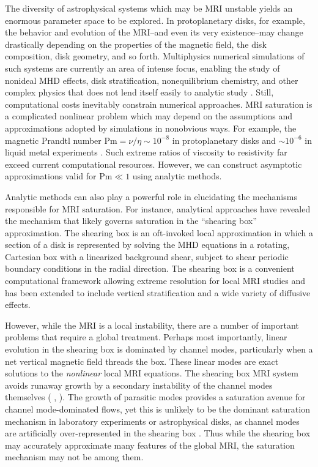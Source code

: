 \documentclass{emulateapj}
\newcommand{\citei}[1]{\citeauthor{#1} \citeyear{#1}}
\newcommand{\Pm}{\mathrm{Pm}}
\begin{document}
The diversity of astrophysical systems which may be MRI unstable yields an enormous parameter space to be explored. In protoplanetary disks, for example, the behavior and evolution of the MRI--and even its very existence--may change drastically depending on the properties of the magnetic field, the disk composition, disk geometry, and so forth. Multiphysics numerical simulations of such systems are currently an area of intense focus, enabling the study of nonideal MHD effects, disk stratification, nonequilibrium chemistry, and other complex physics that does not lend itself easily to analytic study \citep[e.g.][among many others]{Fleming:2003fs,Bai:2011cm, Flock:2013,Suzuki:2014vh}. Still, computational costs inevitably constrain numerical approaches. MRI saturation is a complicated nonlinear problem which may depend on the assumptions and approximations adopted by simulations in nonobvious ways. For example, the magnetic Prandtl number $\Pm = \nu/\eta \sim 10^{-8}$ in protoplanetary disks \citep[e.g.][]{Oishi:2011ei} and $\sim 10^{-6}$ in liquid metal experiments \citep[e.g.][]{Goodman:2002ix}. Such extreme ratios of viscosity to resistivity far exceed current computational resources. However, we can construct asymptotic approximations valid for $\Pm \ll 1$ using analytic methods. 

Analytic methods can also play a powerful role in elucidating the mechanisms responsible for MRI saturation. For instance, analytical approaches have revealed the mechanism that likely governs saturation in the ``shearing box'' approximation. The shearing box is an oft-invoked local approximation in which a section of a disk is represented by solving the MHD equations in a rotating, Cartesian box with a linearized background shear, subject to shear periodic boundary conditions in the radial direction. The shearing box is a convenient computational framework allowing extreme resolution for local MRI studies and has been extended to include vertical stratification and a wide variety of diffusive effects. 

However, while the MRI is a local instability, there are a number of important problems that require a global treatment. Perhaps most importantly, linear evolution in the shearing box is dominated by channel modes, particularly when a net vertical magnetic field threads the box. These linear modes are exact solutions to the \textit{nonlinear} local MRI equations. The shearing box MRI system avoids runaway growth by a secondary instability of the channel modes themselves (\citei{Goodman:1994ul}, \citei{Pessah:2010ic}). The growth of parasitic modes provides a saturation avenue for channel mode-dominated flows, yet this is unlikely to be the dominant saturation mechanism in laboratory experiments or astrophysical disks, as channel modes are artificially over-represented in the shearing box \citep{Latter:2015}. Thus while the shearing box may accurately approximate many features of the global MRI, the saturation mechanism may not be among them. 
\end{document}
